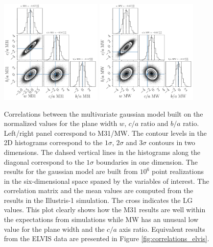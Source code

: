 \documentclass[a4paper,fleqn,usenatbib]{mnras}
\begin{document}
\begin{figure}
\centering
\includegraphics[width=0.45\textwidth]{gaussian_model_illustrisdm_M31.pdf}
\includegraphics[width=0.45\textwidth]{gaussian_model_illustrisdm_MW.pdf}
\caption{Correlations between the multivariate gaussian model built on
  the normalized values for the plane width $w$, $c/a$ ratio and $b/a$ ratio. 
Left/right panel correspond to M31/MW. 
The contour levels in the 2D histograms correspond to the $1\sigma$,
$2\sigma$ and $3\sigma$ contours in two dimensions. 
The dahsed vertical lines in the histograms along the diagonal
correspond to the $1\sigma$ boundaries in one dimension.
The results for the gaussian model are built from $10^6$ point
realizations in the six-dimensional space spaned by the variables of
interest. 
The correlation matrix and the mean values are computed from the
results in the Illustris-1 simulation.
The cross indicates the LG values.
This plot clearly shows how the M31 results are well within the
expectations from simulations while MW has an unusual low value for
the plane width and the $c/a$ axis ratio.
Equivalent results from the ELVIS data are presented in Figure
\ref{fig:correlations_elvis}.
\label{fig:correlations_illustris}}
\end{figure}
\end{document}
